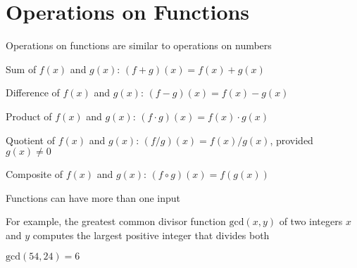 \documentclass[8pt,a4paper,compress]{beamer}
\begin{document}
\section{Operations on Functions}
\begin{frame}[fragile]
\pause

Operations on functions are similar to operations on numbers

\pause\bigskip

Sum of $f(x)$ and $g(x)$: $(f + g)(x) = f(x) + g(x)$

\pause\bigskip

Difference of $f(x)$ and $g(x)$: $(f - g)(x) = f(x) - g(x)$

\pause\bigskip

Product of $f(x)$ and $g(x)$: $(f \cdot g)(x) = f(x) \cdot g(x)$

\pause\bigskip

Quotient of $f(x)$ and $g(x)$: $(f / g)(x) = f(x) / g(x)$, provided $g(x) \neq 0$

\pause\bigskip

Composite of $f(x)$ and $g(x)$: $(f \circ g)(x) = f(g(x))$

\begin{center}
\end{center}
\end{frame}

\begin{frame}[fragile]
\pause

Functions can have more than one input

\pause\bigskip

For example, the greatest common divisor function $\text{gcd}(x, y)$ of two integers $x$ and $y$ computes the largest positive integer that divides both

\pause\bigskip

$\text{gcd}(54, 24) = 6$
\end{frame}
\end{document}
